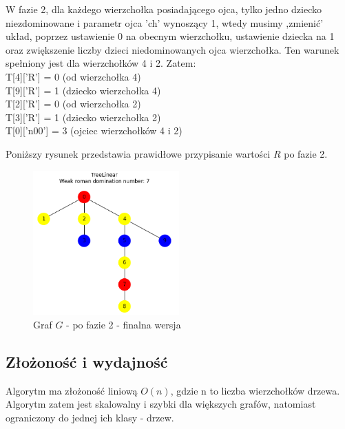 W fazie 2, dla każdego wierzchołka posiadającego ojca, tylko jedno dziecko niezdominowane i parametr ojca 'ch' wynoszący 1, wtedy musimy ,zmienić' układ, poprzez ustawienie 0 na obecnym wierzchołku, ustawienie dziecka na 1 oraz zwiększenie liczby dzieci niedominowanych ojca wierzchołka. 
Ten warunek spełniony jest dla wierzchołków 4 i 2. Zatem:\\
T[4]['R'] = 0  (od wierzchołka 4)\\
T[9]['R'] = 1  (dziecko wierzchołka 4)\\
T[2]['R'] = 0  (od wierzchołka 2)\\
T[3]['R'] = 1  (dziecko wierzchołka 2)\\
T[0]['n00'] = 3  (ojciec wierzchołków 4 i 2)

Poniższy rysunek przedstawia prawidłowe przypisanie wartości $R$ po fazie 2.\\

\begin{figure}[H]
    \centering
    \includegraphics[width=0.5\textwidth]{assets/phase2.png}
    \caption{Graf $G$ - po fazie 2 - finalna wersja}
    \label{fig:drzewoFaza2}
\end{figure}

\subsection{Złożoność i wydajność}
Algorytm ma złożoność liniową $O(n)$, gdzie n to liczba wierzchołków drzewa. Algorytm zatem jest skalowalny i szybki dla większych grafów, natomiast ograniczony do jednej ich klasy - drzew.

